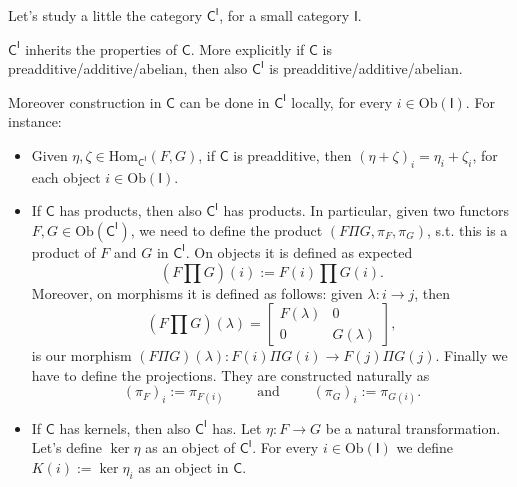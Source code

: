 Let's study a little the category $\mathsf{C}^{\mathsf{I}}$, for a small category $\mathsf{I}$.
\begin{prop}
	$\mathsf{C}^{\mathsf{I}}$ inherits the properties of $\mathsf{C}$.
	More explicitly if $\mathsf{C}$ is preadditive/additive/abelian, then also
	$\mathsf{C}^{\mathsf{I}}$ is preadditive/additive/abelian.
	
	Moreover construction in $\mathsf{C}$ can be done in $\mathsf{C}^{\mathsf{I}}$ locally, for every $i \in \mathrm{Ob} \left(\mathsf{I}\right)$.
	For instance:
	\begin{itemize}
		\item Given $\eta, \zeta \in \mathrm{Hom}_{\mathsf{C}^{\mathsf{I}}} \left( F, G \right)$, if $\mathsf{C}$ is preadditive, then
			$\left( \eta + \zeta \right)_i = \eta_i + \zeta_i$, for each object $i \in \mathrm{Ob} \left(\mathsf{I}\right)$.
		\item If $\mathsf{C}$ has products, then also $\mathsf{C}^{\mathsf{I}}$ has products.
			In particular, given two functors $F,G \in \mathrm{Ob} \left(\mathsf{C}^{\mathsf{I}}\right)$, we need to define the product
			$\left(F \Pi G, \pi_F, \pi_G\right)$, s.t. this is a product of $F$ and $G$ in $\mathsf{C}^{\mathsf{I}}$.
			On objects it is defined as expected
			\begin{equation}
				(F \prod G)(i) := F(i) \prod G(i)
			.\end{equation} 
			Moreover, on morphisms it is defined as follows: given $\lambda: i \to j$, then
			\begin{equation}
				\left( F \prod G \right)(\lambda) = 
				\begin{bmatrix}
					F(\lambda) & 0\\
					0 & G(\lambda)
				\end{bmatrix} 
			,\end{equation} 
			is our morphism $\left( F \Pi G \right)(\lambda): F(i) \Pi G(i) \to F(j) \Pi G(j)$.
			Finally we have to define the projections.
			They are constructed naturally as
			\begin{equation}
				(\pi_F)_i := \pi_{F(i)} \qquad \text{ and } \qquad \left( \pi_G \right)_i := \pi_{G(i)}
			.\end{equation} 
		\item If $\mathsf{C}$ has kernels, then also $\mathsf{C}^{\mathsf{I}}$ has.
			Let $\eta: F \to G$ be a natural transformation.
			Let's define $\ker \eta$ as an object of $\mathsf{C}^{\mathsf{I}}$.
			For every $i \in \mathrm{Ob} \left(\mathsf{I}\right)$ we define $K(i) := \ker \eta_i$ as an object in $\mathsf{C}$.

\end{itemize}
\end{prop}
